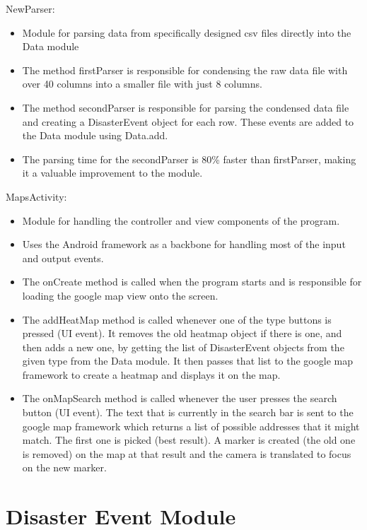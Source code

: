 \documentclass[12pt]{article}
\begin{document}
\noindent NewParser:
\begin{itemize}
\item	Module for parsing data from specifically designed csv files directly into the Data module
\item	The method firstParser is responsible for condensing the raw data file with over 40 columns into a smaller file with just 8 columns.
\item	The method secondParser is responsible for parsing the condensed data file and creating a DisasterEvent object for each row. These events are added to the Data module using Data.add.
\item	The parsing time for the secondParser is 80\% faster than firstParser, making it a valuable improvement to the module.
\end{itemize}

\noindent MapsActivity:
\begin{itemize}
\item	Module for handling the controller and view components of the program.
\item	Uses the Android framework as a backbone for handling most of the input and output events.
\item	The onCreate method is called when the program starts and is responsible for loading the google map view onto the screen.
\item	The addHeatMap method is called whenever one of the type buttons is pressed (UI event). It removes the old heatmap object if there is one, and then adds a new one, by getting the list of DisasterEvent objects from the given type from the Data module. It then passes that list to the google map framework to create a heatmap and displays it on the map.
\item	The onMapSearch method is called whenever the user presses the search button (UI event). The text that is currently in the search bar is sent to the google map framework which returns a list of possible addresses that it might match. The first one is picked (best result). A marker is created (the old one is removed) on the map at that result and the camera is translated to focus on the new marker. 
\end{itemize}


\newpage

\section {Disaster Event Module}
\end{document}

